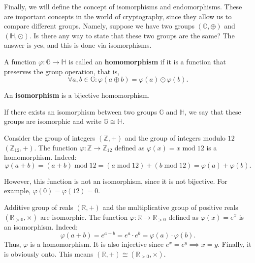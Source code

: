 \documentclass[../lecture-notes.tex]{subfiles}
\begin{document}
Finally, we will define the concept of isomorphisms and endomorphisms. These are important concepts in the world of cryptography, since they allow us to compare different groups. Namely, 
suppose we have two groups $(\mathbb{G},\oplus)$ and $(\mathbb{H}, \odot)$. Is there any way to state that these two groups are the same? The answer is yes, and this is done via isomorphisms.

\begin{definition}
    A function $\varphi: \mathbb{G} \to \mathbb{H}$ is called an \textbf{homomorphism} if it is a function that preserves the group operation, that is, 
    \begin{equation*}
        \forall a,b \in \mathbb{G}: \varphi(a \oplus b) = \varphi(a) \odot \varphi(b).
    \end{equation*}
\end{definition}

\begin{definition}
    An \textbf{isomorphism} is a bijective homomorphism.
\end{definition}

\begin{definition}
    If there exists an isomorphism between two groups $\mathbb{G}$ and $\mathbb{H}$, we say that these groups are isomorphic and write $\mathbb{G} \cong \mathbb{H}$.
\end{definition}

\begin{example}
    Consider the group of integers $(\mathbb{Z},+)$ and the group of integers modulo $12$ $(\mathbb{Z}_{12},+)$. The function $\varphi: \mathbb{Z} \to \mathbb{Z}_{12}$ defined as $\varphi(x) = x \;\text{mod}\; 12$ is a homomorphism. Indeed:
    \begin{equation*}
        \varphi(a+b) = (a+b) \;\text{mod}\; 12 = (a \;\text{mod}\; 12) + (b \;\text{mod}\; 12) = \varphi(a) + \varphi(b).
    \end{equation*}

    However, this function is not an isomorphism, since it is not bijective. For example, $\varphi(0) = \varphi(12) = 0$.
\end{example}

\begin{example}
    Additive group of reals $(\mathbb{R}, +)$ and the multiplicative group of positive reals $(\mathbb{R}_{>0}, \times)$ are isomorphic. The function $\varphi: \mathbb{R} \to \mathbb{R}_{>0}$ defined as $\varphi(x) = e^x$ is an isomorphism. Indeed:
    \begin{equation*}
        \varphi(a+b) = e^{a+b} = e^a \cdot e^b = \varphi(a) \cdot \varphi(b).
    \end{equation*}
    Thus, $\varphi$ is a homomorphism. It is also injective since $e^x = e^y \implies x=y$. Finally, it is obviously onto. This means $(\mathbb{R}, +) \cong (\mathbb{R}_{>0}, \times)$.
\end{example}
\end{document}
